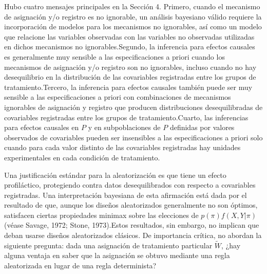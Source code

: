 \documentclass[12pt,a4paper]{article}
\begin{document}
Hubo cuatro mensajes principales en la Sección 4. Primero, cuando el mecanismo de asignación y/o registro es no ignorable, un análisis bayesiano válido requiere la incorporación de modelos para los mecanismos no ignorables, así como un modelo que relacione las variables observadas con las variables no observadas utilizadas en dichos mecanismos no ignorables.Segundo, la inferencia para efectos causales es generalmente muy sensible a las especificaciones a priori cuando los mecanismos de asignación y/o registro son no ignorables, incluso cuando no hay desequilibrio en la distribución de las covariables registradas entre los grupos de tratamiento.Tercero, la inferencia para efectos causales también puede ser muy sensible a las especificaciones a priori con combinaciones de mecanismos ignorables de asignación y registro que producen distribuciones desequilibradas de covariables registradas entre los grupos de tratamiento.Cuarto, las inferencias para efectos causales en $P$ y en subpoblaciones de $P$ definidas por valores observados de covariables pueden ser insensibles a las especificaciones a priori solo cuando para cada valor distinto de las covariables registradas hay unidades experimentales en cada condición de tratamiento. 

Una justificación estándar para la aleatorización es que tiene un efecto profiláctico, protegiendo contra datos desequilibrados con respecto a covariables registradas. Una interpretación bayesiana de esta afirmación está dada por el resultado de que, aunque los diseños aleatorizados generalmente no son óptimos, satisfacen ciertas propiedades minimax sobre las elecciones de $p(\pi)f(X,Y|\pi)$ (véase Savage, 1972; Stone, 1973).Estos resultados, sin embargo, no implican que deban usarse diseños aleatorizados clásicos. De importancia crítica, no abordan la siguiente pregunta: dada una asignación de tratamiento particular $\tilde{W}$, ¿hay alguna ventaja en saber que la asignación se obtuvo mediante una regla aleatorizada en lugar de una regla determinista? 
\end{document}
